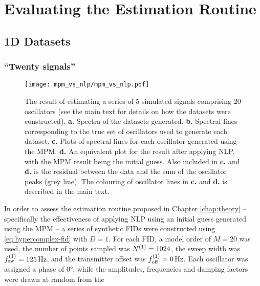 \section{Evaluating the Estimation Routine}
\label{sec:evaluation}

\subsection{\acs{1D} Datasets}
\label{subsec:onedim}

\subsubsection{``Twenty signals''}
\begin{sidewaysfigure}
    \centering
    \texttt{[image: mpm\_vs\_nlp/mpm\_vs\_nlp.pdf]}
    \caption[
        The result of estimating a series of 5 simulated signals comprising 20
        oscillators, using solely the \acs{MPM} and also with phase
        variance-regularised \acs{NLP} afterwards.
    ]{
        The result of estimating a series of 5 simulated signals comprising 20
        oscillators (see the main text for details on how the datasets were constructed).
        \textbf{a.} Spectra of the datasets generated.
        \textbf{b.} Spectral lines corresponding to the true set of oscillators
        used to generate each dataset.
        \textbf{c.} Plots of spectral lines for each oscillator generated using
        the \acs{MPM}.
        \textbf{d.} An equivalent plot for the result after applying \acs{NLP},
        with the \acs{MPM} result being the initial guess.
        Also included in \textbf{c.} and \textbf{d.} is the residual between the
        data and the sum of the oscillator peaks (grey line).
        The colouring of oscillator lines in \textbf{c.} and \textbf{d.} is
        described in the main text.
    }
    \label{fig:mpm_vs_nlp}
\end{sidewaysfigure}
In order to assess the estimation routine proposed in Chapter \ref{chap:theory}
-- specifically the effectiveness of applying \ac{NLP} using an initial guess
generated using the \ac{MPM} -- a series of synthetic \acp{FID} were constructed
using \eqref{eq:hypercomplex-fid} with $D=1$. For each \ac{FID}, a model order
of $M=20$ was used, the number of points sampled was $N^{(1)} = 1024$, the sweep
width was $f_{\mathrm{sw}}^{(1)}=\qty{125}{\hertz}$, and the transmitter offset was $f_{\mathrm{off}}^{(1)}
= \qty{0}{\hertz}$.  Each oscillator was assigned a phase of \ang{0}, while the
amplitudes, frequencies and damping factors were drawn at random from the

